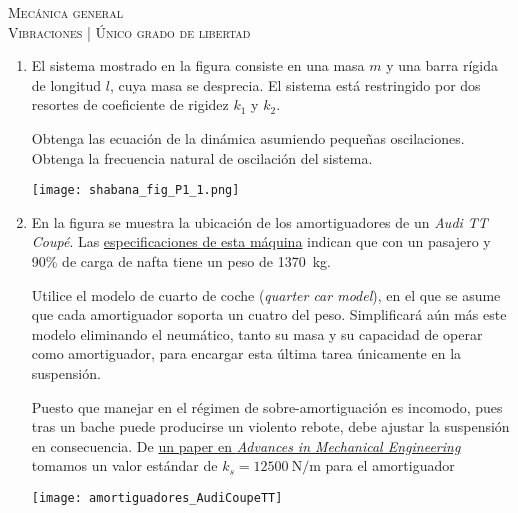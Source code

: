 \documentclass[11pt,spanish,a4paper]{article}
\begin{document}
\begin{center}
	\textsc{\large Mecánica general}\\
	\textsc{\large Vibraciones | Único grado de libertad}
\end{center}


\begin{enumerate}

				
\item 
\begin{minipage}[t][4cm]{0.65\textwidth}
El sistema mostrado en la figura consiste en una masa $m$ y una barra rígida de longitud $l$, cuya masa se desprecia.
El sistema está restringido por dos resortes de coeficiente de rigidez $k_1$ y $k_2$.

Obtenga las ecuación de la dinámica asumiendo pequeñas oscilaciones.
Obtenga la frecuencia natural de oscilación del sistema.
\end{minipage}
\begin{minipage}[c][3cm][t]{0.3\textwidth}
	\texttt{[image: shabana\_fig\_P1\_1.png]}
\end{minipage}



\item 
\begin{minipage}[t][6cm]{0.65\textwidth}
En la figura se muestra la ubicación de los amortiguadores de un \emph{Audi TT Coupé}.
Las \href{https://www.audi.de/de/brand/de/neuwagen/tt/tt-coupe.html#layer=/de/brand/de/neuwagen/tt/tt-coupe.engine_compare.fvp09g_0.techdata.html}{especificaciones de esta máquina} indican que con un pasajero y 90\% de carga de nafta tiene un peso de \SI{1370}{\kilo\gram}.

Utilice el modelo de cuarto de coche (\emph{quarter car model}), en el que se asume que cada amortiguador soporta un cuatro del peso.
Simplificará aún más este modelo eliminando el neumático, tanto su masa y su capacidad de operar como amortiguador, para encargar esta última tarea únicamente en la suspensión.

Puesto que manejar en el régimen de sobre-amortiguación es incomodo, pues tras un bache puede producirse un violento rebote, debe ajustar la suspensión en consecuencia.
De \href{https://journals.sagepub.com/doi/pdf/10.1177/1687814016648638}{un paper en \emph{Advances in Mechanical Engineering}} tomamos un valor estándar de $k_s = \SI{12500}{\newton\per\metre}$ para el amortiguador
\end{minipage}
\begin{minipage}[c][0cm][t]{0.3\textwidth}
	\texttt{[image: amortiguadores\_AudiCoupeTT]}
\end{minipage}




\end{enumerate}
\end{document}
